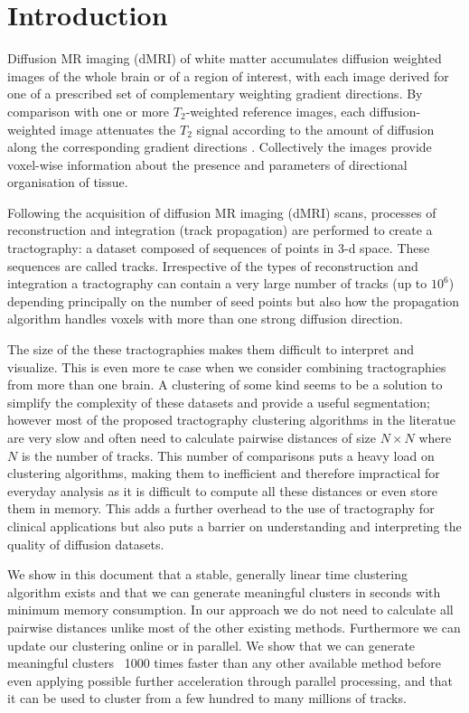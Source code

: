 \documentclass[preprint,authoryear,a4paper,10pt,onecolumn]{elsarticle}
\begin{document}
\section{Introduction}

Diffusion MR imaging (dMRI) of white matter accumulates diffusion
weighted images of the whole brain or of a region of interest, with each
image derived for one of a prescribed set of complementary weighting
gradient directions. By comparison with one or more $T_{2}$-weighted
reference images, each diffusion-weighted image attenuates the $T_{2}$
signal according to the amount of diffusion along the corresponding
gradient directions \citep{DiffMRIBook}. Collectively the images provide
voxel-wise information about the presence and parameters of directional
organisation of tissue.

Following the acquisition of diffusion MR imaging (dMRI) scans,
processes of reconstruction and integration (track propagation) are
performed to create a tractography: a dataset composed of sequences of
points in 3-d space. These sequences are called tracks. Irrespective of
the types of reconstruction and integration a tractography can contain a
very large number of tracks (up to $10^6$) depending principally on the
number of seed points but also how the propagation algorithm handles
voxels with more than one strong diffusion direction.

The size of the these tractographies makes them difficult to interpret
and visualize. This is even more te case when we consider combining
tractographies from more than one brain. A clustering of some kind seems
to be a solution to simplify the complexity of these datasets and
provide a useful segmentation; however most of the proposed tractography
clustering algorithms in the literatue are very slow and often need to
calculate pairwise distances of size $N\times N$ where $N$ is the number
of tracks. This number of comparisons puts a heavy load on clustering
algorithms, making them to inefficient and therefore impractical for
everyday analysis as it is difficult to compute all these distances or
even store them in memory. This adds a further overhead to the use of
tractography for clinical applications but also puts a barrier on
understanding and interpreting the quality of diffusion datasets. 

We show in this document that a stable, generally linear time clustering
algorithm exists and that we can generate meaningful clusters in seconds
with minimum memory consumption. In our approach we do not need to
calculate all pairwise distances unlike most of the other existing
methods. Furthermore we can update our clustering online or in
parallel. We show that we can generate meaningful clusters ~1000 times
faster than any other available method before even applying possible
further acceleration through parallel processing, and that it can be
used to cluster from a few hundred to many millions of tracks.
\end{document}
